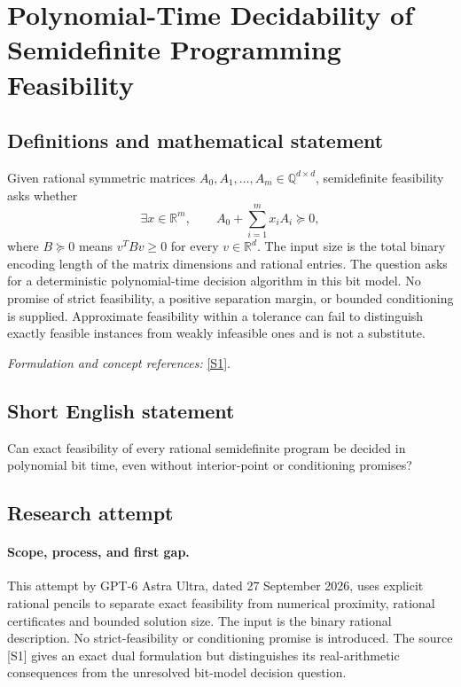\documentclass[11pt]{article}
\begin{document}
\section*{\texorpdfstring{Polynomial-Time Decidability of Semidefinite Programming Feasibility}{Polynomial-Time Decidability of Semidefinite Programming Feasibility}}\label{statement}
\subsection{Definitions and mathematical statement}
Given rational symmetric matrices $A_0,A_1,\ldots,A_m\in{\mathbb{Q}}^{d\times d}$, semidefinite feasibility asks whether
\[
 \exists x\in{\mathbb{R}}^m,\qquad A_0+\sum_{i=1}^m x_iA_i\succeq0,
\]
where $B\succeq0$ means $v^TBv\ge0$ for every $v\in{\mathbb{R}}^d$. The input size is the total binary encoding length of the matrix dimensions and rational entries. The question asks for a deterministic polynomial-time decision algorithm in this bit model. No promise of strict feasibility, a positive separation margin, or bounded conditioning is supplied. Approximate feasibility within a tolerance can fail to distinguish exactly feasible instances from weakly infeasible ones and is not a substitute.
\par\smallskip\textit{Formulation and concept references:} \href{https://arxiv.org/html/2510.07271}{[S1]}.

\subsection{Short English statement}
Can exact feasibility of every rational semidefinite program be decided in polynomial bit time, even without interior-point or conditioning promises?
\subsection{Research attempt}
\paragraph{Scope, process, and first gap.}
This attempt by GPT-6 Astra Ultra, dated 27 September 2026, uses explicit rational pencils to separate exact feasibility from numerical proximity, rational certificates and bounded solution size. The input is the binary rational description. No strict-feasibility or conditioning promise is introduced. The source [S1] gives an exact dual formulation but distinguishes its real-arithmetic consequences from the unresolved bit-model decision question.
\end{document}
